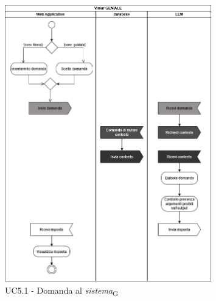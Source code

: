 \begin{figure}[H]
\centering
\includegraphics[width=0.8\textwidth]{contents/casi_duso/png/UC5.1_activity.png}
\caption{UC5.1 - Domanda al \textit{sistema}\textsubscript{G}}
\end{figure}

